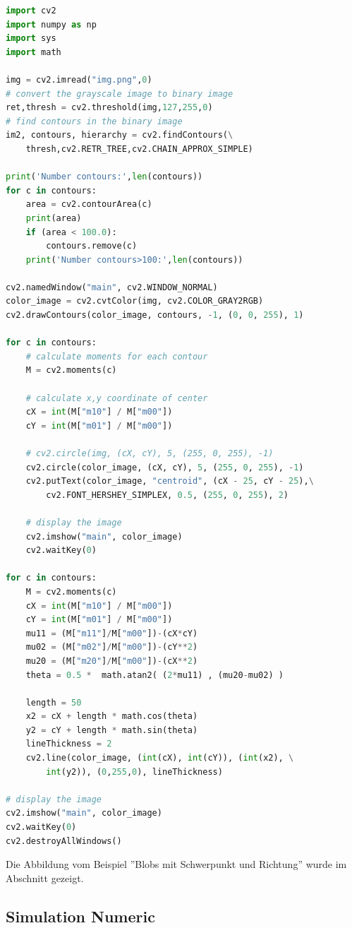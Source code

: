 \documentclass[a4paper]{report}
\begin{document}
\begin{lstlisting}[language=Python, caption=Simulation in OpenCV]      
import cv2
import numpy as np 
import sys
import math

img = cv2.imread("img.png",0)
# convert the grayscale image to binary image
ret,thresh = cv2.threshold(img,127,255,0)
# find contours in the binary image
im2, contours, hierarchy = cv2.findContours(\
	thresh,cv2.RETR_TREE,cv2.CHAIN_APPROX_SIMPLE)

print('Number contours:',len(contours))
for c in contours:
    area = cv2.contourArea(c)
    print(area)
	if (area < 100.0):
		contours.remove(c)
	print('Number contours>100:',len(contours))

cv2.namedWindow("main", cv2.WINDOW_NORMAL)
color_image = cv2.cvtColor(img, cv2.COLOR_GRAY2RGB)
cv2.drawContours(color_image, contours, -1, (0, 0, 255), 1) 

for c in contours:
    # calculate moments for each contour
    M = cv2.moments(c)

    # calculate x,y coordinate of center
    cX = int(M["m10"] / M["m00"])
    cY = int(M["m01"] / M["m00"])
   
    # cv2.circle(img, (cX, cY), 5, (255, 0, 255), -1)
    cv2.circle(color_image, (cX, cY), 5, (255, 0, 255), -1)
    cv2.putText(color_image, "centroid", (cX - 25, cY - 25),\
    	cv2.FONT_HERSHEY_SIMPLEX, 0.5, (255, 0, 255), 2)

    # display the image
    cv2.imshow("main", color_image)
    cv2.waitKey(0)
    
for c in contours:
    M = cv2.moments(c)
    cX = int(M["m10"] / M["m00"])
    cY = int(M["m01"] / M["m00"])
    mu11 = (M["m11"]/M["m00"])-(cX*cY)
    mu02 = (M["m02"]/M["m00"])-(cY**2)
    mu20 = (M["m20"]/M["m00"])-(cX**2)
    theta = 0.5 *  math.atan2( (2*mu11) , (mu20-mu02) )
      
    length = 50
    x2 = cX + length * math.cos(theta)
    y2 = cY + length * math.sin(theta) 
    lineThickness = 2
    cv2.line(color_image, (int(cX), int(cY)), (int(x2), \
    	int(y2)), (0,255,0), lineThickness)
    
# display the image
cv2.imshow("main", color_image)
cv2.waitKey(0)    
cv2.destroyAllWindows()
\end{lstlisting}

Die Abbildung vom Beispiel ''Blobs mit Schwerpunkt und Richtung'' wurde im  Abschnitt \textbf{ } gezeigt.\\

\subsection{Simulation Numeric}
\end{document}
